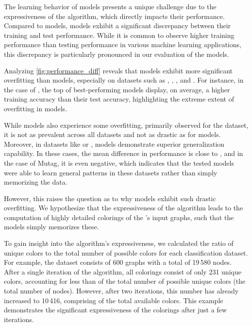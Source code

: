 The learning behavior of \wlnn models presents a unique challenge due to the expressiveness of the \wl algorithm, which directly impacts their performance. Compared to \gnn models, \wlnn models exhibit a significant discrepancy between their training and test performance. While it is common to observe higher training performance than testing performance in various machine learning applications, this discrepancy is particularly pronounced in our evaluation of the \wlnn models.

Analyzing \cref{fig:performance_diff} reveals that \wlnn models exhibit more significant overfitting than \gnn models, especially on datasets such as \enzymes, \mutag, \proteins, and \reddit. For instance, in the case of \enzymes, the top  of best-performing \wlnn models display, on average, a  higher training accuracy than their test accuracy, highlighting the extreme extent of overfitting in \wlnn models.

While \gnn models also experience some overfitting, primarily observed for the \nci dataset, it is not as prevalent across all datasets and not as drastic as for \wlnn models. Moreover, in datasets like \mutag or \reddit, \gnn models demonstrate superior generalization capability. In these cases, the mean difference in performance is close to , and in the case of Mutag, it is even negative, which indicates that the tested \gnn models were able to learn general patterns in these datasets rather than simply memorizing the data.

However, this raises the question as to why \wlnn models exhibit such drastic overfitting. We hypothesize that the expressiveness of the \wl algorithm leads to the computation of highly detailed colorings of the \wlnn's input graphs, such that the models simply memorizes these.

To gain insight into the algorithm's expressiveness, we calculated the ratio of unique colors to the total number of possible colors for each classification dataset. For example, the \enzymes dataset consists of 600 graphs with a total of 19\,580 nodes. After a single iteration of the \wl algorithm, all colorings consist of only 231 unique colors, accounting for less than  of the total number of possible unique colors (the total number of nodes). However, after two iterations, this number has already increased to 10\,416, comprising  of the total available colors. This example demonstrates the significant expressiveness of the colorings after just a few iterations.

